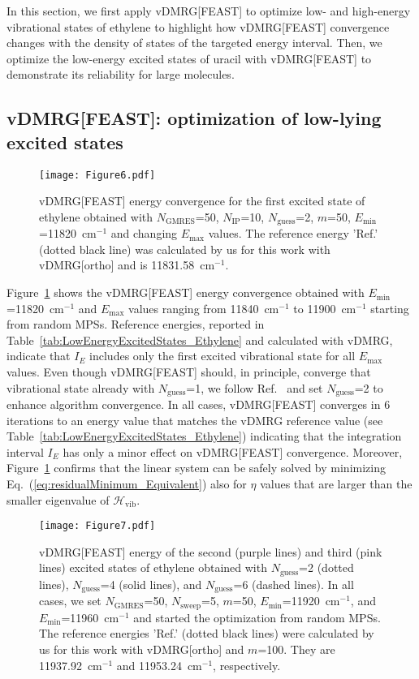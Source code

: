 \documentclass[journal=jctcce]{achemso}
\begin{document}
In this section, we first apply vDMRG[FEAST] to optimize low- and high-energy vibrational states of ethylene to highlight how vDMRG[FEAST] convergence changes with the density of states of the targeted energy interval.
Then, we optimize the low-energy excited states of uracil with vDMRG[FEAST] to demonstrate its reliability for large molecules.

\subsection{vDMRG[FEAST]: optimization of low-lying excited states}

\begin{figure}[htbp!]
  \centering
  \texttt{[image: Figure6.pdf]}
  \caption{vDMRG[FEAST] energy convergence for the first excited state of ethylene obtained with $N_\text{GMRES}$=50, $N_\text{IP}$=10, $N_\text{guess}$=2, $m$=50, $E_\text{min}$=11820~cm$^{-1}$ and changing $E_\text{max}$ values.
  The reference energy 'Ref.' (dotted black line) was calculated by us for this work with vDMRG[ortho] and is 11831.58~cm$^{-1}$.}
  \label{fig:Ethylene_LowestExcited}
\end{figure}

\noindent Figure~\ref{fig:Ethylene_LowestExcited} shows the vDMRG[FEAST] energy convergence obtained with $E_\text{min}$=11820~cm$^{-1}$ and $E_\text{max}$ values ranging from 11840~cm$^{-1}$ to 11900~cm$^{-1}$ starting from random MPSs.
Reference energies, reported in Table~\ref{tab:LowEnergyExcitedStates_Ethylene} and calculated with vDMRG,\cite{Baiardi2019_HighEnergy-vDMRG} indicate that $I_E$ includes only the first excited vibrational state for all $E_\text{max}$ values.
Even though vDMRG[FEAST] should, in principle, converge that vibrational state already with $N_\text{guess}$=1, we follow Ref.~ and set $N_\text{guess}$=2 to enhance algorithm convergence.
In all cases, vDMRG[FEAST] converges in 6 iterations to an energy value that matches the vDMRG reference value (see Table~\ref{tab:LowEnergyExcitedStates_Ethylene}) indicating that the integration interval $I_E$ has only a minor effect on vDMRG[FEAST] convergence.
Moreover, Figure~\ref{fig:Ethylene_LowestExcited} confirms that the linear system can be safely solved by minimizing Eq.~(\ref{eq:residualMinimum_Equivalent}) also for $\eta$ values that are larger than the smaller eigenvalue of $\mathcal{H}_\text{vib}$.

\begin{figure}[htbp!]
  \centering
  \texttt{[image: Figure7.pdf]}
  \caption{vDMRG[FEAST] energy of the second (purple lines) and third (pink lines) excited states of ethylene obtained with $N_\text{guess}$=2 (dotted lines), $N_\text{guess}$=4 (solid lines), and $N_\text{guess}$=6 (dashed lines).
  In all cases, we set $N_\text{GMRES}$=50, $N_\text{sweep}$=5, $m$=50, $E_\text{min}$=11920~cm$^{-1}$, and $E_\text{min}$=11960~cm$^{-1}$ and started the optimization from random MPSs.
  The reference energies 'Ref.' (dotted black lines) were calculated by us for this work with vDMRG[ortho]
  and $m$=100. They are 11937.92~cm$^{-1}$ and 11953.24~cm$^{-1}$, respectively.}
  \label{fig:Ethylene_SecondLowest}
\end{figure}
\end{document}
